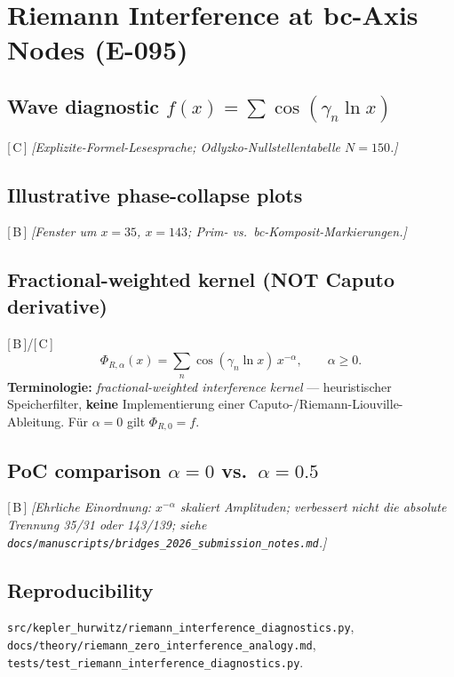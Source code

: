 \documentclass[11pt,a4paper]{article}
\newcommand{\evidence}[1]{\textnormal{[\,#1\,]}}
\newcommand{\placeholder}[1]{\textit{[#1]}}
\newcommand{\repo}[1]{\texttt{#1}}
\begin{document}
\section{Riemann Interference at bc-Axis Nodes (E-095)}
\label{sec:riemann}

\subsection{Wave diagnostic $f(x)=\sum\cos(\gamma_n\ln x)$}
\evidence{C}
\placeholder{Explizite-Formel-Lesesprache; Odlyzko-Nullstellentabelle $N{=}150$.}

\subsection{Illustrative phase-collapse plots}
\evidence{B}
\placeholder{Fenster um $x{=}35$, $x{=}143$; Prim- vs.\ bc-Komposit-Markierungen.}

\subsection{Fractional-weighted kernel (NOT Caputo derivative)}
\evidence{B}/\evidence{C}
\begin{equation}
  \Phi_{R,\alpha}(x) = \sum_n \cos(\gamma_n \ln x)\, x^{-\alpha},
  \qquad \alpha \ge 0.
\end{equation}
\textbf{Terminologie:} \emph{fractional-weighted interference kernel} --- heuristischer
Speicherfilter, \textbf{keine} Implementierung einer Caputo-/Riemann-Liouville-Ableitung.
Für $\alpha{=}0$ gilt $\Phi_{R,0}=f$.

\subsection{PoC comparison $\alpha{=}0$ vs.\ $\alpha{=}0.5$}
\evidence{B}
\placeholder{Ehrliche Einordnung: $x^{-\alpha}$ skaliert Amplituden; verbessert
\emph{nicht} die absolute Trennung 35/31 oder 143/139; siehe
\repo{docs/manuscripts/bridges_2026_submission_notes.md}.}

\subsection{Reproducibility}
\repo{src/kepler_hurwitz/riemann_interference_diagnostics.py},
\repo{docs/theory/riemann_zero_interference_analogy.md},
\repo{tests/test_riemann_interference_diagnostics.py}.
\end{document}

